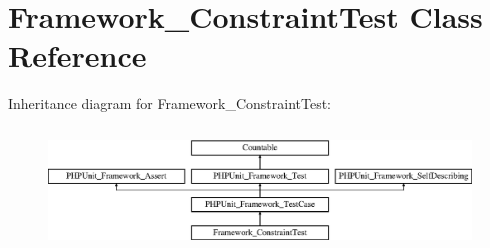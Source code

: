 \hypertarget{class_framework___constraint_test}{}\section{Framework\+\_\+\+Constraint\+Test Class Reference}
\label{class_framework___constraint_test}
Inheritance diagram for Framework\+\_\+\+Constraint\+Test\+:\begin{figure}[H]
\begin{center}
\leavevmode
\includegraphics[height=3.303835cm]{class_framework___constraint_test}
\end{center}
\end{figure}
